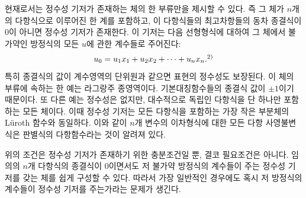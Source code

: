 현재로서는 정수성 기저가 존재하는 체의 한 부류만을 제시할 수 있다. 즉 그 체가 $n$개의 다항식으로 이루어진 한 계를 포함하고, 이 다항식들의 최고차항들의 동차 종결식이 0이 아니면 정수성 기저가 존재한다. 이 기저는 다음 선형형식에 대하여 그 체에서 불가약인 방정식의 모든 $u$에 관한 계수들로 주어진다:
\[
  u_0=u_1x_1+u_2x_2+\cdots+u_nx_n.\srcfnmark{2)}
\]
특히 종결식의 값이 계수영역의 단위원과 같으면 표현의 정수성도 보장된다. 이 체의 부류에 속하는 한 예는 라그랑주 종영역이다. 기본대칭함수들의 종결식 값이 $\pm 1$이기 때문이다. 또 다른 예는 정수성은 없지만, 대수적으로 독립인 다항식을 단 하나만 포함하는 모든 체이다. 이때 정수성 기저는 모든 다항식을 포함하는 가장 작은 부분체의 Lüroth 함수와 동일하다. 이와 같이 $n$개 변수의 이차형식에 대한 모든 다항 사영불변식은 판별식의 다항함수라는 것이 알려져 있다.

위의 조건은 정수성 기저가 존재하기 위한 충분조건일 뿐, 결코 필요조건은 아니다. 임의의 $n$개 다항식의 종결식이 0이면서도 저 불가약 방정식의 계수들이 주는 정수성 기저를 갖는 체를 쉽게 구성할 수 있다. 따라서 가장 일반적인 경우에도 혹시 저 방정식의 계수들이 정수성 기저를 주는가라는 문제가 생긴다.
